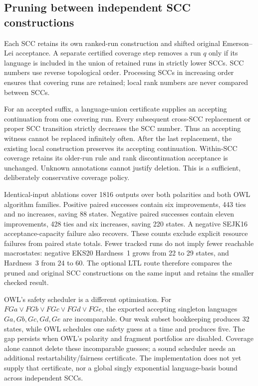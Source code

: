 \subsection{Pruning between independent SCC constructions}
Each SCC retains its own ranked-run construction and shifted original
Emerson--Lei acceptance. A separate certified coverage step removes a run
$q$ only if its language is included in the union of retained runs in
strictly lower SCCs. SCC numbers use reverse topological order.
Processing SCCs in increasing order ensures that covering runs are retained;
local rank numbers are never compared between SCCs.

For an accepted suffix, a language-union certificate supplies an accepting
continuation from one covering run. Every subsequent cross-SCC replacement
or proper SCC transition strictly decreases the SCC number. Thus an accepting
witness cannot be replaced infinitely often. After the last replacement,
the existing local construction preserves its accepting continuation.
Within-SCC coverage retains its older-run rule and rank discontinuation
acceptance is unchanged. Unknown annotations cannot justify deletion.
This is a sufficient, deliberately conservative coverage policy.

Identical-input ablations cover 1816 outputs over both polarities and both
OWL algorithm families. Positive paired successes contain six improvements,
443 ties and no increases, saving 88 states. Negative paired successes
contain eleven improvements, 428 ties and six increases, saving 220 states.
A negative SEJK16 acceptance-capacity failure also recovers. These counts
exclude explicit resource failures from paired state totals.
Fewer tracked runs do not imply fewer reachable macrostates: negative EKS20
Hardness~1 grows from 22 to 29 states, and Hardness~3 from 24 to 60.
The optional LTL route therefore compares the pruned and original SCC
constructions on the same input and retains the smaller checked result.

OWL's safety scheduler is a different optimisation. For
$FGa\lor FGb\lor FGc\lor FGd\lor FGe$, the exported accepting singleton
languages $Ga,Gb,Gc,Gd,Ge$ are incomparable. Our weak subset bookkeeping
produces 32 states, while OWL schedules one safety guess at a time and
produces five. The gap persists when OWL's polarity and fragment portfolios
are disabled. Coverage alone cannot delete these incomparable guesses;
a sound scheduler needs an additional restartability/fairness certificate.
The implementation does not yet supply that certificate, nor a global
singly exponential language-basis bound across independent SCCs.
